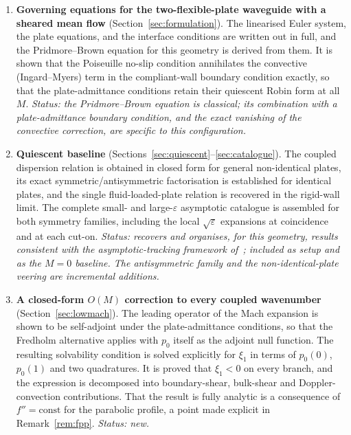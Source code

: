 \documentclass[11pt,a4paper]{article}
\newcommand{\eps}{\varepsilon}
\theoremstyle{plain}
\theoremstyle{remark}
\begin{document}
\begin{enumerate}[label=(\roman*),leftmargin=2.2em]
\item \textbf{Governing equations for the two-flexible-plate waveguide with a sheared mean flow}
(Section~\ref{sec:formulation}). The linearised Euler system, the plate equations, and the interface
conditions are written out in full, and the Pridmore--Brown equation for this geometry is derived from
them. It is shown that the Poiseuille no-slip condition annihilates the convective (Ingard--Myers) term
in the compliant-wall boundary condition exactly, so that the plate-admittance conditions retain their
quiescent Robin form at all $M$. \emph{Status: the Pridmore--Brown equation is classical; its
combination with a plate-admittance boundary condition, and the exact vanishing of the convective
correction, are specific to this configuration.}

\item \textbf{Quiescent baseline} (Sections~\ref{sec:quiescent}--\ref{sec:catalogue}). The coupled
dispersion relation is obtained in closed form for general non-identical plates, its exact
symmetric/antisymmetric factorisation is established for identical plates, and the single
fluid-loaded-plate relation is recovered in the rigid-wall limit. The complete small- and large-$\eps$
asymptotic catalogue is assembled for both symmetry families, including the local $\sqrt\eps$
expansions at coincidence and at each cut-on. \emph{Status: recovers and organises, for this geometry,
results consistent with the asymptotic-tracking framework
of~\cite{sarkarsonti,kunte2011,prakash2016}; included as setup and as the $M=0$ baseline. The
antisymmetric family and the non-identical-plate veering are incremental additions.}

\item \textbf{A closed-form $O(M)$ correction to every coupled wavenumber}
(Section~\ref{sec:lowmach}). The leading operator of the Mach expansion is shown to be self-adjoint
under the plate-admittance conditions, so that the Fredholm alternative applies with $p_0$ itself as
the adjoint null function. The resulting solvability condition is solved explicitly for $\xi_1$ in
terms of $p_0(0)$, $p_0(1)$ and two quadratures. It is proved that $\xi_1<0$ on every branch, and the
expression is decomposed into boundary-shear, bulk-shear and Doppler-convection contributions. That the
result is fully analytic is a consequence of $f''=\text{const}$ for the parabolic profile, a point made
explicit in Remark~\ref{rem:fpp}. \emph{Status: new.}


\end{enumerate}
\end{document}
